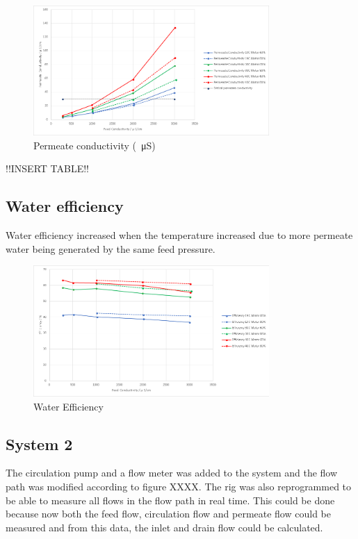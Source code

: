 \begin{figure}[H]
    \centering
    \includegraphics[width=0.8\textwidth]{PermCond}
    \caption{Permeate conductivity (\SI{}{\micro\siemens})}
    \label{fig:Permeatecond}
\end{figure}

!!INSERT TABLE!!

\subsection{Water efficiency}

Water efficiency increased when the temperature increased due to more permeate water being generated by the same feed pressure.

\begin{figure}[H]
    \centering
    \includegraphics[width=0.8\textwidth]{Efficiency}
    \caption{Water Efficiency}
    \label{fig:Weff}
\end{figure}

\newpage

\subsection{System 2}

The circulation pump and a flow meter was added to the system and the flow path was modified according to figure XXXX. The rig was also reprogrammed to be able to measure all flows in the flow path in real time. This could be done because now both the feed flow, circulation flow and permeate flow could be measured and from this data, the inlet and drain flow could be calculated. 


